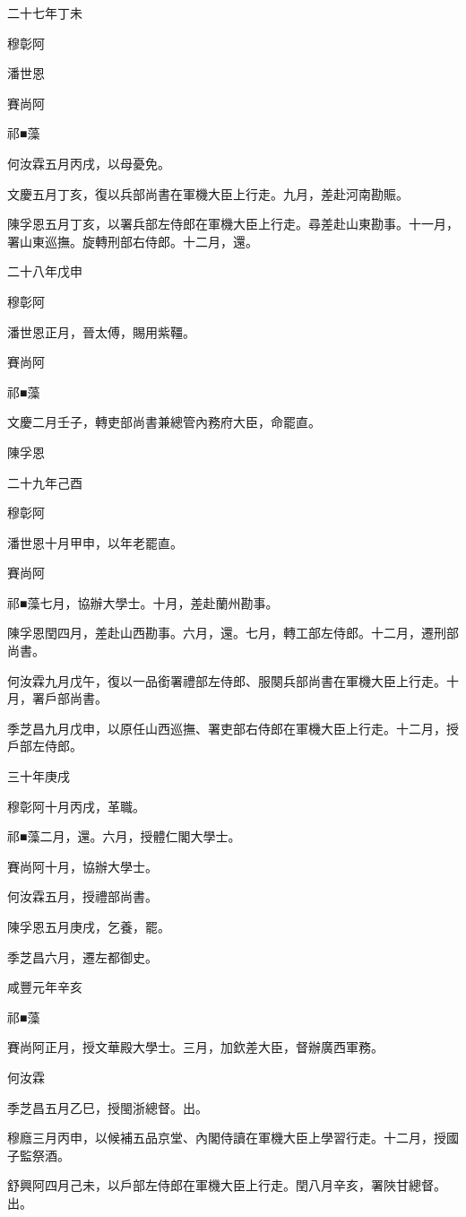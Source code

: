 \begin{pinyinscope}
二十七年丁未

穆彰阿

潘世恩

賽尚阿

祁■藻

何汝霖五月丙戌，以母憂免。

文慶五月丁亥，復以兵部尚書在軍機大臣上行走。九月，差赴河南勘賑。

陳孚恩五月丁亥，以署兵部左侍郎在軍機大臣上行走。尋差赴山東勘事。十一月，署山東巡撫。旋轉刑部右侍郎。十二月，還。

二十八年戊申

穆彰阿

潘世恩正月，晉太傅，賜用紫韁。

賽尚阿

祁■藻

文慶二月壬子，轉吏部尚書兼總管內務府大臣，命罷直。

陳孚恩

二十九年己酉

穆彰阿

潘世恩十月甲申，以年老罷直。

賽尚阿

祁■藻七月，協辦大學士。十月，差赴蘭州勘事。

陳孚恩閏四月，差赴山西勘事。六月，還。七月，轉工部左侍郎。十二月，遷刑部尚書。

何汝霖九月戊午，復以一品銜署禮部左侍郎、服闋兵部尚書在軍機大臣上行走。十月，署戶部尚書。

季芝昌九月戊申，以原任山西巡撫、署吏部右侍郎在軍機大臣上行走。十二月，授戶部左侍郎。

三十年庚戌

穆彰阿十月丙戌，革職。

祁■藻二月，還。六月，授體仁閣大學士。

賽尚阿十月，協辦大學士。

何汝霖五月，授禮部尚書。

陳孚恩五月庚戌，乞養，罷。

季芝昌六月，遷左都御史。

咸豐元年辛亥

祁■藻

賽尚阿正月，授文華殿大學士。三月，加欽差大臣，督辦廣西軍務。

何汝霖

季芝昌五月乙巳，授閩浙總督。出。

穆廕三月丙申，以候補五品京堂、內閣侍讀在軍機大臣上學習行走。十二月，授國子監祭酒。

舒興阿四月己未，以戶部左侍郎在軍機大臣上行走。閏八月辛亥，署陜甘總督。出。


\end{pinyinscope}
